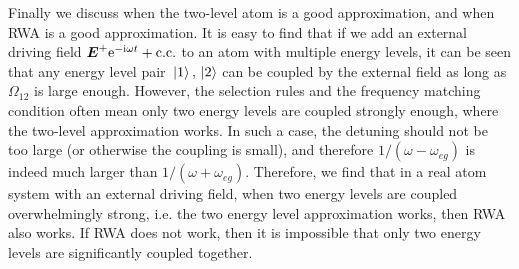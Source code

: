 \documentclass[hyperref, a4paper]{article}
\newcommand*{\ii}{\mathrm{i}}
\newcommand*{\ee}{\mathrm{e}}
\begin{document}
Finally we discuss when the two-level atom is a good approximation, and when RWA is a good approximation.
It is easy to find that if we add an external driving field $\vb*{E}^+ \ee^{- \ii \omega t} + \text{c.c.}$
to an atom with multiple energy levels, it can be seen that any energy level pair $\ket*{1}, \ket*{2}$ can 
be coupled by the external field as long as $\Omega_{12}$ is large enough. However, the selection rules 
and the frequency matching condition often mean only two energy levels are coupled strongly enough, where
the two-level approximation works. In such a case, the detuning should not be too large (or otherwise 
the coupling is small), and therefore $1 / (\omega - \omega_{eg})$ is indeed much larger than 
$1 / (\omega + \omega_{eg})$. Therefore, we find that in a real atom system with an external driving field,
when two energy levels are coupled overwhelmingly strong, i.e. the two energy level approximation works,
then RWA also works. If RWA does not work, then it is impossible that only two energy levels are significantly
coupled together. 
\end{document}
